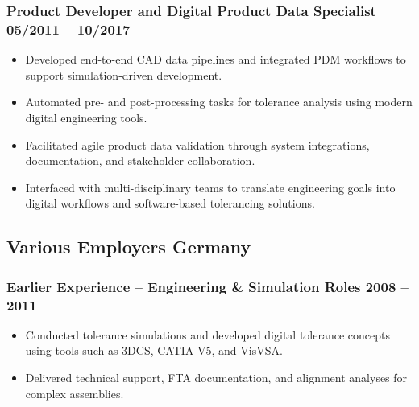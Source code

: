 \documentclass[11pt]{article} %
\begin{document}
	\subsubsection{Product Developer and Digital Product Data Specialist \hfill 05/2011 – 10/2017}
	\begin{itemize}[itemsep=4pt, topsep=2pt, left=1em]
		\item Developed end-to-end CAD data pipelines and integrated PDM workflows to support simulation-driven development.
		\item Automated pre- and post-processing tasks for tolerance analysis using modern digital engineering tools.
		\item Facilitated agile product data validation through system integrations, documentation, and stakeholder collaboration.
		\item Interfaced with multi-disciplinary teams to translate engineering goals into digital workflows and software-based tolerancing solutions.
	\end{itemize}
	
	\subsection{Various Employers \hfill Germany}
	\subsubsection{Earlier Experience – Engineering \& Simulation Roles \hfill 2008 –  2011}
	\begin{itemize}[itemsep=4pt, topsep=2pt, left=1em]
		\item Conducted tolerance simulations and developed digital tolerance concepts using tools such as 3DCS, CATIA V5, and VisVSA.  
		\item Delivered technical support, FTA documentation, and alignment analyses for complex assemblies.  
	\end{itemize}
	
	
\end{document}
